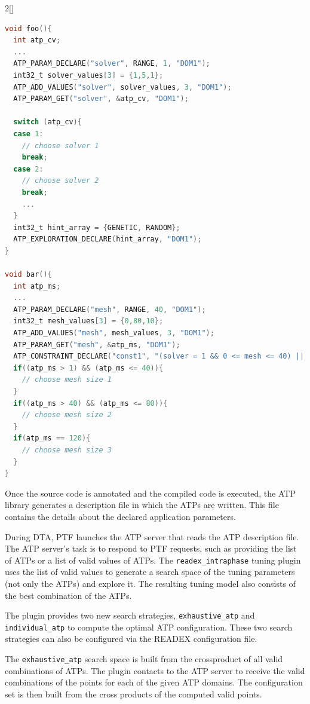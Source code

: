 \begin{multicols}{2}[] \label{lbl:atp_example}
\begin{lstlisting}[language=C,xleftmargin=3em,frame=none,title=\phantom{xxx}]
void foo(){
  int atp_cv;
  ...
  ATP_PARAM_DECLARE("solver", RANGE, 1, "DOM1");
  int32_t solver_values[3] = {1,5,1};
  ATP_ADD_VALUES("solver", solver_values, 3, "DOM1");
  ATP_PARAM_GET("solver", &atp_cv, "DOM1");
	
  switch (atp_cv){
  case 1:
    // choose solver 1
    break;
  case 2:
    // choose solver 2
    break;
    ...
  }
  int32_t hint_array = {GENETIC, RANDOM};
  ATP_EXPLORATION_DECLARE(hint_array, "DOM1");
}
	
void bar(){
  int atp_ms;
  ...
  ATP_PARAM_DECLARE("mesh", RANGE, 40, "DOM1");
  int32_t mesh_values[3] = {0,80,10};
  ATP_ADD_VALUES("mesh", mesh_values, 3, "DOM1");
  ATP_PARAM_GET("mesh", &atp_ms, "DOM1");
  ATP_CONSTRAINT_DECLARE("const1", "(solver = 1 && 0 <= mesh <= 40) || (solver = 2 && 40 <= mesh <= 80) || (solver > 2 && mesh = 120)", "DOM1");
  if((atp_ms > 1) && (atp_ms <= 40)){
    // choose mesh size 1
  }
  if((atp_ms > 40) && (atp_ms <= 80)){
    // choose mesh size 2
  }
  if(atp_ms == 120){
    // choose mesh size 3
  }
}
\end{lstlisting}
\end{multicols}

Once the source code is annotated and the compiled code is executed, the ATP library generates a description file in which the ATPs are written. This file contains the details about the declared application parameters.

During DTA, PTF launches the ATP server that reads the ATP description file. The ATP server's task is to respond to PTF requests, such as providing the list of ATPs or a list of valid values of ATPs. The \texttt{readex\_intraphase} tuning plugin uses the list of valid values to generate a search space of the tuning parameters (not only the ATPs) and explore it. The resulting tuning model also consists of the best combination of the ATPs.

The plugin provides two new search strategies, \texttt{exhaustive\_atp} and \linebreak[4]\texttt{individual\_atp} to compute the optimal ATP configuration. These two search strategies can also be configured via the READEX configuration file.

The \texttt{exhaustive\_atp} search space is built from the crossproduct of all valid combinations of ATPs. The plugin contacts to the ATP server to receive the valid combinations of the points for each of the given ATP domains. The configuration set is then built from the cross products of the computed valid points. 

